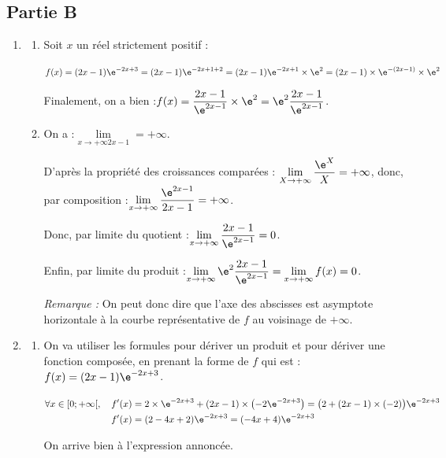 \subsection*{Partie B}
	\begin{enumerate}
		\item \begin{enumerate}
			\item Soit $x$ un réel strictement positif :

			$f(x) = (2x - 1)\e^{-2x + 3}= (2x - 1)\e^{-2x + 1 + 2} = (2x - 1)\e^{-2x + 1}\times \e^{2} = (2x - 1)\times \e^{-(2x - 1)} \times \e^{2}$

			Finalement, on a bien :\quad $f(x) = \dfrac{2x - 1}{\e^{2x - 1}} \times \e^{2} = \e^{2}\dfrac{2x - 1}{\e^{2x - 1}}$.

			\item On a :\quad $\lim\limits_{x \to +\infty 2x - 1} = +\infty$.

			D'après la propriété des croissances comparées : \quad $\lim\limits_{X \to +\infty} \dfrac{\e^{X}}{X} = +\infty$, \quad donc, par composition :\quad $\lim\limits_{x \to +\infty} \dfrac{\e^{2x - 1}}{2x - 1}= + \infty$.

			Donc, par limite du quotient :\quad $\lim\limits_{x \to +\infty} \dfrac{2x - 1}{\e^{2x - 1}}= 0$.

			Enfin, par limite du produit :\quad $\lim\limits_{x \to +\infty} \e^{2}\dfrac{2x - 1}{\e^{2x - 1}} = \lim\limits_{x \to +\infty} f(x) = 0$.

			\emph{Remarque :} On peut donc dire que l'axe des abscisses est asymptote horizontale à la courbe représentative de $f$ au voisinage de $+\infty$.
		\end{enumerate}

		\item \begin{enumerate}
			\item On va utiliser les formules pour dériver un produit et pour dériver une fonction composée, en prenant la forme de $f$ qui est : \quad $f(x) = (2x-1)\e^{-2x+3}$.

			$\forall x \in [0 ; +\infty[,\quad \begin{aligned}[t]
			f'(x) &= 2 \times \e^{-2x + 3} + (2x-1) \times \left(-2\e^{-2x+3}\right) = \big(2 + (2x-1)\times(-2)\big)\e^{-2x+3} \\
			f'(x)&= (2 - 4x + 2)\e^{-2x+3} = (-4x+4)\e^{-2x+3}
			\end{aligned}$

			On arrive bien à l'expression annoncée.


\end{enumerate}
\end{enumerate}
